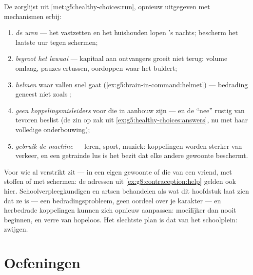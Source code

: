 \begin{method}\label{met:g8:protecting-the-nervous-system:manual}
De zorglijst uit \cref{met:g5:healthy-choices:run}, opnieuw uitgegeven met
mechanismen erbij:
\begin{enumerate}
  \item \emph{ de uren} --- het vastzetten en het huishouden lopen
        's nachts; bescherm het laatste uur tegen schermen;
  \item \emph{begroot het lawaai} --- kapitaal aan ontvangers groeit niet
        terug: volume omlaag, pauzes ertussen, oordoppen waar het buldert;
  \item \emph{helmen} waar vallen snel gaat
        (\cref{ex:g5:brain-in-command:helmet}) --- bedrading geneest niet
        zoals ;
  \item \emph{geen koppelingsmisleiders} voor  die in aanbouw zijn
        --- en de ``nee'' rustig van tevoren beslist
        (de zin op zak uit \cref{ex:g5:healthy-choices:answers}, nu met
        haar volledige onderbouwing);
  \item \emph{gebruik de machine} --- leren, sport, muziek: koppelingen
        worden sterker van verkeer, en een getrainde lus is het bezit dat
        elke andere gewoonte beschermt.
\end{enumerate}
\end{method}

\begin{example}\label{ex:g8:protecting-the-nervous-system:help}
Voor wie al verstrikt zit --- in een eigen gewoonte of die van een vriend,
met stoffen of met schermen: de adressen uit
\cref{ex:g8:contraception:help} gelden ook hier. Schoolverpleegkundigen en
artsen behandelen  als wat dit hoofdstuk laat zien dat ze is ---
een bedradingsprobleem, geen oordeel over je karakter --- en herbedrade
koppelingen kunnen zich opnieuw aanpassen: moeilijker dan nooit beginnen,
en verre van hopeloos. Het slechtste plan is dat van het schoolplein:
zwijgen.
\end{example}

\section{Oefeningen}

